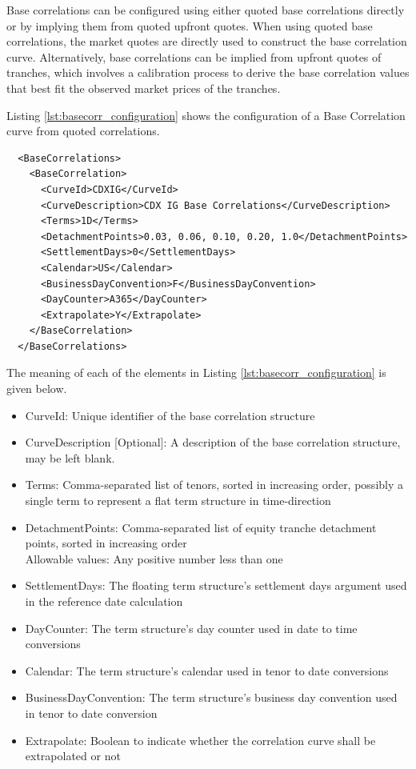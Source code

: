 Base correlations can be configured using either quoted base correlations directly or by implying them from quoted upfront quotes.
When using quoted base correlations, the market quotes are directly used to construct the base correlation curve.
Alternatively, base correlations can be implied from upfront quotes of tranches, which involves a calibration process to
derive the base correlation values that best fit the observed market prices of the tranches.


Listing \ref{lst:basecorr_configuration} shows the configuration of a Base Correlation curve from quoted correlations.

\begin{longlisting}
\begin{verbatim}
  <BaseCorrelations>
    <BaseCorrelation>
      <CurveId>CDXIG</CurveId>
      <CurveDescription>CDX IG Base Correlations</CurveDescription>
      <Terms>1D</Terms>
      <DetachmentPoints>0.03, 0.06, 0.10, 0.20, 1.0</DetachmentPoints>
      <SettlementDays>0</SettlementDays>
      <Calendar>US</Calendar>
      <BusinessDayConvention>F</BusinessDayConvention>
      <DayCounter>A365</DayCounter>
      <Extrapolate>Y</Extrapolate>
    </BaseCorrelation>
  </BaseCorrelations>
\end{verbatim}
\caption{Base Correlation Configuration}
\label{lst:basecorr_configuration}
\end{longlisting}

The meaning of each of the elements in Listing \ref{lst:basecorr_configuration} is given below.

\begin{itemize}
\item CurveId: Unique identifier of the base correlation structure
\item CurveDescription [Optional]: A description of the base correlation structure, may be left blank.
\item Terms: Comma-separated list of tenors, sorted in increasing order, possibly a single term to represent a flat term structure in time-direction
\item DetachmentPoints: Comma-separated list of equity tranche detachment points, sorted in increasing order\\
Allowable values: Any positive number less than one
\item SettlementDays: The floating term structure's settlement days argument used in the reference date calculation
\item DayCounter: The term structure's day counter used in date to time conversions
\item Calendar: The term structure's calendar used in tenor to date conversions
\item BusinessDayConvention: The term structure's business day convention used in tenor to date conversion
\item Extrapolate: Boolean to indicate whether the correlation curve shall be extrapolated or not
\end{itemize}

